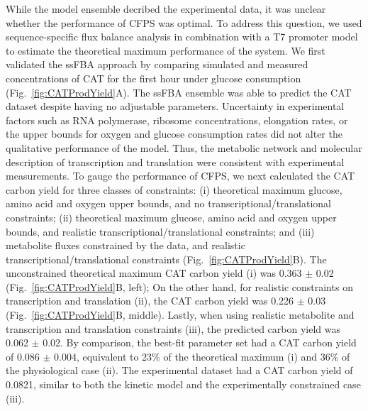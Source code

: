 \documentclass[12pt]{article}
\begin{document}
While the model ensemble decribed the experimental data, it was unclear whether the performance of CFPS was optimal.
To address this question, we used sequence-specific flux balance analysis in combination with a T7 promoter model to estimate the theoretical maximum performance of the system.
We first validated the ssFBA approach by comparing simulated and measured concentrations of CAT for the first hour under glucose consumption (Fig.~\ref{fig:CATProdYield}A).
The ssFBA ensemble was able to predict the CAT dataset despite having no adjustable parameters.
Uncertainty in experimental factors such as RNA polymerase, ribosome concentrations, elongation rates, or the upper bounds for oxygen and glucose consumption rates did not alter the qualitative performance of the model. 
Thus, the metabolic network and molecular description of transcription and translation were consistent with experimental measurements.
To gauge the performance of CFPS, we next calculated the CAT carbon yield for three classes of constraints: (i) theoretical maximum glucose, amino acid and oxygen upper bounds, and no transcriptional/translational constraints; (ii) theoretical maximum glucose, amino acid and oxygen upper bounds, and realistic transcriptional/translational constraints; and (iii) metabolite fluxes constrained by the data, and realistic transcriptional/translational constraints (Fig.~\ref{fig:CATProdYield}B).
The unconstrained theoretical maximum CAT carbon yield (i) was 0.363 $\pm$ 0.02 (Fig.~\ref{fig:CATProdYield}B, left);
On the other hand, for realistic constraints on transcription and translation (ii), the CAT carbon yield was 0.226 $\pm$ 0.03 (Fig.~\ref{fig:CATProdYield}B, middle).
Lastly, when using realistic metabolite and transcription and translation constraints (iii), the predicted carbon yield was 0.062 $\pm$ 0.02.
By comparison, the best-fit parameter set had a CAT carbon yield of 0.086 $\pm$ 0.004, equivalent to 23\% of the theoretical maximum (i) and 36\% of the physiological case (ii).
The experimental dataset had a CAT carbon yield of 0.0821, similar to both the kinetic model and the experimentally constrained case (iii).  
\end{document}
